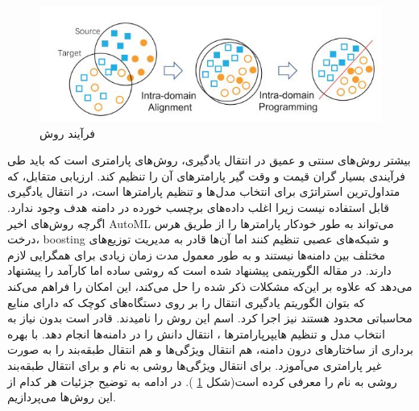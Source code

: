 {\begin{figure}
	\centering
	\includegraphics[scale=0.6]{images/easyTL.JPG}
	\caption{ فرآیند روش 
	  }
	\label{fig:6}
\end{figure}
		 بیشتر روش‌های سنتی و عمیق در انتقال یادگیری، روش‌های پارامتری است که باید طی فرآیندی بسیار گران قیمت و وقت گیر پارامترهای آن را تنظیم کند. ارزیابی متقابل، که متداول‌ترین استراتژی برای انتخاب مدل‌ها و تنظیم پارامترها است، در انتقال یادگیری قابل استفاده نیست زیرا اغلب داده‌های برچسب خورده در دامنه هدف وجود ندارد. اگرچه روش‌های اخیر AutoML می‌تواند به طور خودکار پارامترها را از طریق هرس درخت، boosting و شبکه‌های عصبی تنظیم کنند اما آن‌ها قادر به مدیریت توزیع‌های مختلف بین دامنه‌ها نیستند و به طور معمول مدت زمان زیادی برای همگرایی لازم دارند. در مقاله
\cite{wang2019easy}
الگوریتمی پیشنهاد شده است که روشی ساده اما کارآمد را پیشنهاد می‌دهد که علاوه بر این‌که مشکلات ذکر شده را حل می‌کند، این امکان را فراهم می‌کند که بتوان الگوریتم یادگیری انتقال را بر روی دستگاه‌های کوچک که دارای منایع محاسباتی محدود هستند نیز اجرا کرد. اسم این روش را
نامیدند.
قادر است بدون نیاز به انتخاب مدل و تنظیم هایپرپارامترها ، انتقال دانش را در دامنه‌ها انجام دهد.
با بهره برداری از ساختارهای درون دامنه، هم انتقال ویژگی‌ها و هم انتقال طبقه‌بند را به صورت غیر پارامتری می‌آموزد. برای انتقال ویژگی‌ها روشی به نام
 و برای انتقال طبقه‌بند روشی به نام
  را معرفی کرده است(شکل 
\ref{fig:6}
  ). در ادامه به توضیح جزئیات هر کدام از این روش‌ها می‌پردازیم.
}
